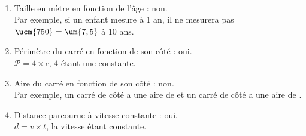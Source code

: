    \ \\ [-5mm]
   \begin{enumerate}
      \item Taille en mètre en fonction de l'âge : {\blue non}. \\
         Par exemple, si un enfant mesure  à 1 an, il ne mesurera pas $\ucm{750} =\um{7,5}$ à 10 ans.
      \item Périmètre du carré en fonction de son côté : {\blue oui}. \\
         $\mathcal{P} =4\times c$, 4 étant une constante.
      \item Aire du carré en fonction de son côté  : {\blue non}. \\
         Par exemple, un carré de côté  a une aire de  et un carré de côté  a une aire de .
      \item Distance parcourue à vitesse constante : {\blue oui}. \\
         $d =v\times t$, la vitesse étant constante.
   \end{enumerate}
